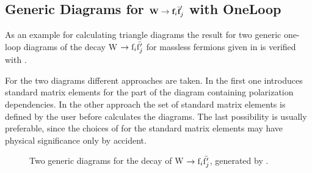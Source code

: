 \subsection{Generic Diagrams for
${\rm {\small\tt \textbf{W}}} \rightarrow {\rm {\small\tt \textbf{f}}}_i \bar{{\small\tt \textbf{f}}}'_j$ with  OneLoop}
\label{generic}

As an example for calculating triangle diagrams the result 
for two generic one-loop diagrams of the 
decay W $\rightarrow {\rm f}_i \bar{{\rm f}'_j}$ for massless fermions
given in \cite{ansgar} 
is verified with \fc. 

For the two diagrams different approaches are taken. 
In the first one \fc introduces standard matrix elements 
for the part of the diagram containing polarization 
dependencies.
In the other approach the set of standard matrix elements is defined 
by the user before \fc calculates the diagrams.
The last possibility is usually preferable, since the choices of \fc
for the standard matrix elements may have physical significance only 
by accident.

\begin{figure}[H]
\begin{center}
\caption{Two generic diagrams for the decay of W $\rightarrow {\rm f}_i \bar{{\rm f}'_j}$, generated by \fa.}
\end{center}
\end{figure}

